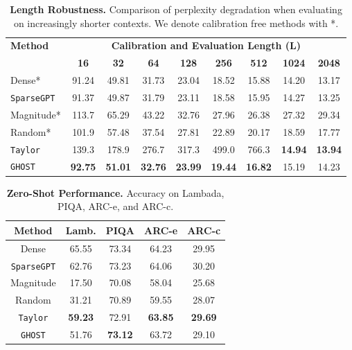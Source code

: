 \documentclass{article}
\theoremstyle{plain}
\theoremstyle{definition}
\theoremstyle{remark}
\begin{document}
\begin{table}[h]
\centering
\caption{\textbf{Length Robustness.} Comparison of perplexity degradation when evaluating on increasingly shorter contexts. We denote calibration free methods with *.}
\label{tab:length_robust}
\begin{tabular}{l|cccccccc}
\toprule
\textbf{Method} & \multicolumn{8}{c}{\textbf{Calibration and Evaluation Length ($\bm{L}$)}} \\
& \textbf{16} & \textbf{32} & \textbf{64} & \textbf{128} & \textbf{256} & \textbf{512} & \textbf{1024} & \textbf{2048} \\
\midrule
Dense* & 91.24  & 49.81  & 31.73  & 23.04  & 18.52  & 15.88  & 14.20 & 13.17 \\
\texttt{SparseGPT} & 91.37  & 49.87  & 31.79  & 23.11  & 18.58  & 15.95  & 14.27 & 13.25 \\
\midrule
Magnitude*      & 113.7             & 65.29             & 43.22             & 32.76             & 27.96             & 26.38             & 27.32             & 29.34 \\
Random*         & 101.9             & 57.48             & 37.54             & 27.81             & 22.89             & 20.17             & 18.59             & 17.77 \\
\texttt{Taylor}          & 139.3             & 178.9             & 276.7             & 317.3             & 499.0             & 766.3             & \textbf{14.94}    & \textbf{13.94} \\
\texttt{GHOST}  & \textbf{92.75}    & \textbf{51.01}    & \textbf{32.76}    & \textbf{23.99}    & \textbf{19.44}    & \textbf{16.82}    & 15.19             & 14.23 \\
\bottomrule
\end{tabular}
\end{table}

\begin{table}[h]
\centering
\caption{\textbf{Zero-Shot Performance.} Accuracy on Lambada, PIQA, ARC-e, and ARC-c.}
\label{tab:zero_shot}
\begin{tabular}{c|cccc}
\toprule
\textbf{Method} & \textbf{Lamb.}   & \textbf{PIQA}    & \textbf{ARC-e}   & \textbf{ARC-c} \\
\midrule
Dense                                  & 65.55 & 73.34 & 64.23 & 29.95 \\
\texttt{SparseGPT}                              & 62.76 & 73.23 & 64.06 & 30.20 \\
\midrule
Magnitude                              & 17.50 & 70.08 & 58.04 & 25.68 \\
Random                                 & 31.21 & 70.89 & 59.55 & 28.07 \\
\texttt{Taylor}                                 & \textbf{59.23} & 72.91 & \textbf{63.85} & \textbf{29.69} \\
\texttt{GHOST}                                  & 51.76 & \textbf{73.12} & 63.72 & 29.10 \\
\bottomrule
\end{tabular}
\end{table}
\end{document}
